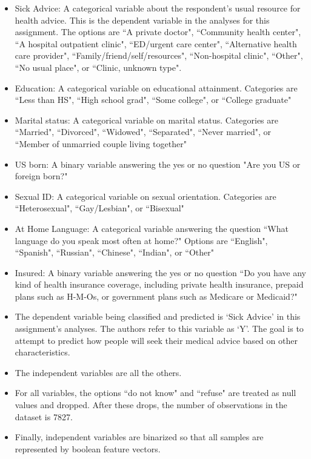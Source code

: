 \documentclass[10pt,twocolumn]{article}
\begin{document}
\begin{itemize}
\item Sick Advice: A categorical variable about the respondent's usual resource for
health advice. This is the dependent variable in the analyses for this
assignment. The options are
``A private doctor",
``Community health center",
``A hospital outpatient clinic",
``ED/urgent care center",
``Alternative health care provider",
``Family/friend/self/resources",
``Non-hospital clinic",
``Other",
``No usual place", or
``Clinic, unknown type".
\item Education: A categorical variable on educational attainment. Categories are ``Less than HS", ``High school grad",
``Some college", or ``College graduate"
\item Marital status: A categorical variable on marital status. Categories are
``Married",
``Divorced",
``Widowed",
``Separated",
``Never married", or
``Member of unmarried couple living together"
\item US born: A binary variable answering the yes or no question "Are you US or foreign born?"
\item Sexual ID: A categorical variable on sexual orientation. Categories are
``Heterosexual",
``Gay/Lesbian", or
``Bisexual"
\item At Home Language: A categorical variable answering the question ``What language do you
speak most often at
home?" Options are
``English",
``Spanish",
``Russian",
``Chinese",
``Indian", or
``Other"
\item Insured: A binary variable answering the yes or no question ``Do you have any
kind of health
insurance coverage,
including private
health insurance,
prepaid plans such as
H-M-Os, or
government plans
such as Medicare or
Medicaid?"
\item The dependent variable being classified and predicted is `Sick Advice' in this assignment's
analyses. The authors refer to this variable as `Y'. The goal is to attempt to
predict how people will seek their medical advice based on other characteristics.
\item The independent variables are all the others.
\item  For all variables, the options ``do not know" and ``refuse"
are treated as null values and dropped. After these drops, the number of observations
in the dataset is 7827.
\item Finally, independent variables are binarized so that all samples are represented
by boolean feature vectors.
\end{itemize}
\end{document}
